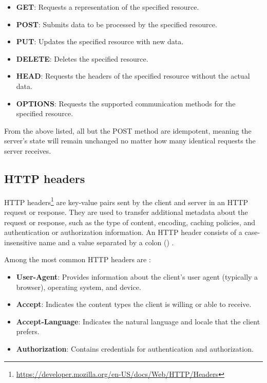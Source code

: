 \begin{itemize}
	\item \textbf{GET}: Requests a representation of the specified resource.
	\item \textbf{POST}: Submits data to be processed by the specified resource.
	\item \textbf{PUT}: Updates the specified resource with new data.
	\item \textbf{DELETE}: Deletes the specified resource.
	\item \textbf{HEAD}: Requests the headers of the specified resource without the actual data.
	\item \textbf{OPTIONS}: Requests the supported communication methods for the specified resource.
\end{itemize}

From the above listed, all but the POST method are idempotent, meaning the server's state will remain unchanged no matter how many identical requests the server receives.

\subsection{HTTP headers}

HTTP headers\footnote{\url{https://developer.mozilla.org/en-US/docs/Web/HTTP/Headers}} are key-value pairs sent by the client and server in an HTTP request or response. They are used to transfer additional metadata about the request or response, such as the type of content, encoding, caching policies, and authentication or authorization information. An HTTP header consists of a case-insensitive name and a value separated by a colon (\uv{:}) \cite{RFC9110}.

Among the most common HTTP headers are \cite{MDN}:

\begin{itemize}
	\item \textbf{User-Agent}: Provides information about the client's user agent (typically a browser), operating system, and device.
	\item \textbf{Accept}: Indicates the content types the client is willing or able to receive.
	\item \textbf{Accept-Language}: Indicates the natural language and locale that the client prefers.
	\item \textbf{Authorization}: Contains credentials for authentication and authorization.
\end{itemize}

